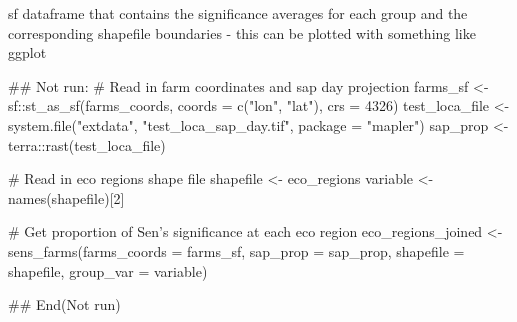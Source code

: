 %
\begin{Value}
sf dataframe that contains the significance averages for each group
and the corresponding shapefile boundaries - this can be plotted with
something like ggplot
\end{Value}
%
\begin{Examples}
\begin{ExampleCode}
## Not run: 
# Read in farm coordinates and sap day projection
farms_sf <- sf::st_as_sf(farms_coords, coords = c("lon", "lat"), crs = 4326)
test_loca_file <- system.file("extdata", "test_loca_sap_day.tif",
                              package = "mapler")
sap_prop <- terra::rast(test_loca_file)

# Read in eco regions shape file
shapefile <- eco_regions
variable <- names(shapefile)[2]

# Get proportion of Sen's significance at each eco region
eco_regions_joined <- sens_farms(farms_coords = farms_sf, sap_prop = sap_prop,
                                 shapefile = shapefile, group_var = variable)

## End(Not run)
\end{ExampleCode}
\end{Examples}
